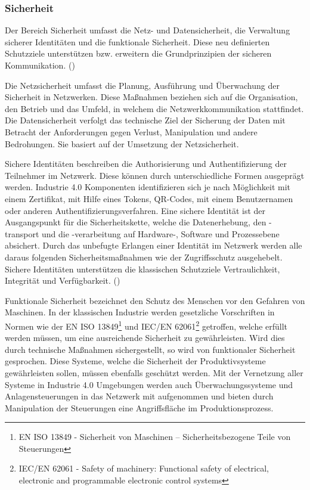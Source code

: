 \subsubsection{Sicherheit}
Der Bereich Sicherheit umfasst die Netz- und Datensicherheit, die Verwaltung sicherer Identitäten und die funktionale Sicherheit. Diese neu definierten Schutzziele unterstützen bzw. erweitern die Grundprinzipien der sicheren Kommunikation. (\cite{BMWiNeCon2016})

Die Netzsicherheit umfasst die Planung, Ausführung und Überwachung der Sicherheit in Netzwerken. Diese Maßnahmen beziehen sich auf die Organisation, den Betrieb und das Umfeld, in welchem die Netzwerkkommunikation stattfindet. Die Datensicherheit verfolgt das technische Ziel der Sicherung der Daten mit Betracht der Anforderungen gegen Verlust, Manipulation und andere Bedrohungen. Sie basiert auf der Umsetzung der Netzsicherheit.

Sichere Identitäten beschreiben die Authorisierung und Authentifizierung der Teilnehmer im Netzwerk. Diese können durch unterschiedliche Formen ausgeprägt werden. Industrie 4.0 Komponenten identifizieren sich je nach Möglichkeit mit einem Zertifikat, mit Hilfe eines Tokens, QR-Codes, mit einem Benutzernamen oder anderen Authentifizierungsverfahren. Eine sichere Identität ist der Ausgangspunkt für die Sicherheitskette, welche die Datenerhebung, den -transport und die -verarbeitung auf Hardware-, Software und Prozessebene absichert. Durch das unbefugte Erlangen einer Identität im Netzwerk werden alle daraus folgenden Sicherheitsmaßnahmen wie der Zugriffsschutz ausgehebelt. Sichere Identitäten unterstützen die klassischen Schutzziele Vertraulichkeit, Integrität und Verfügbarkeit. (\cite{sichIden2017})

Funktionale Sicherheit bezeichnet den Schutz des Menschen vor den Gefahren von Maschinen. In der klassischen Industrie werden gesetzliche Vorschriften in Normen wie der EN ISO 13849\footnote{EN ISO 13849 - Sicherheit von Maschinen – Sicherheitsbezogene Teile von Steuerungen} und \ac{IEC}/EN 62061\footnote{IEC/EN 62061 - Safety of machinery: Functional safety of electrical, electronic and programmable electronic control systems} getroffen, welche erfüllt werden müssen, um eine ausreichende Sicherheit zu gewährleisten. Wird dies durch technische Maßnahmen sichergestellt, so wird von funktionaler Sicherheit gesprochen. Diese Systeme, welche die Sicherheit der Produktivsysteme gewährleisten sollen, müssen ebenfalls geschützt werden. Mit der Vernetzung aller Systeme in Industrie 4.0 Umgebungen werden auch Überwachungssysteme und Anlagensteuerungen in das Netzwerk mit aufgenommen und bieten durch Manipulation der Steuerungen eine Angriffsfläche im Produktionsprozess.

